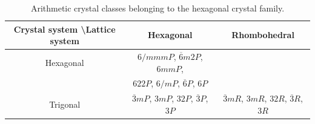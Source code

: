 \begin{table}[htb]
  \centering
  \caption{Arithmetic crystal classes belonging to the hexagonal crystal family.}
  \label{tab:hexagonal_crystal_family}
  \begin{tabular}{c|c|c}
    \hline
      Crystal system \textbackslash Lattice system & Hexagonal & Rhombohedral \\ \hline
      Hexagonal & $6/mmmP$, $\overline{6}m2P$, $6mmP$,  & \\
                & $622P$, $6/mP$, $\overline{6}P$, $6P$ & \\ \hline
      Trigonal  & $\overline{3}mP$, $3mP$, $32P$, $\overline{3}P$, $3P$ & $\overline{3}mR$, $3mR$, $32R$, $\overline{3}R$, $3R$ \\
    \hline
  \end{tabular}
\end{table}
